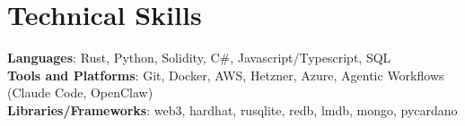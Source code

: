 \documentclass[letterpaper,11pt]{article}
\begin{document}
%
\section{Technical Skills}
 \begin{itemize}[leftmargin=0.15in, label={}]
    \small{\item{
     \textbf{Languages}{: Rust, Python, Solidity, C\#, Javascript/Typescript, SQL} \\
     \textbf{Tools and Platforms}{: Git, Docker, AWS, Hetzner, Azure, Agentic Workflows (Claude Code, OpenClaw)} \\
     \textbf{Libraries/Frameworks}{: web3, hardhat, rusqlite, redb, lmdb, mongo, pycardano} \\
    }}
 \end{itemize}


\end{document}
